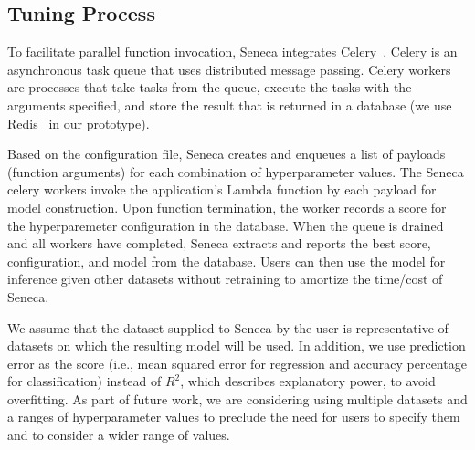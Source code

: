 \subsection{Tuning Process}

To facilitate parallel function invocation, Seneca integrates 
Celery~\cite{ref:celery}.
Celery is an asynchronous task queue 
that uses distributed message passing. Celery workers are processes 
that take tasks from the queue, execute the tasks with the arguments specified, 
and store the result that is returned 
in a database (we use Redis~\cite{ref:redis}
in our prototype). 

Based on the configuration file, Seneca creates and enqueues a list of
payloads (function arguments) for each combination of hyperparameter
values.  The Seneca celery workers invoke the application's Lambda
function by each payload for model construction. Upon function
termination, the worker records a score for the hyperparemeter
configuration in the database.  When the queue is drained and all
workers have completed, Seneca extracts and reports the best score,
configuration, and model from the database. Users can then use the
model for inference given other datasets without retraining to
amortize the time/cost of Seneca.


We assume that the dataset supplied to Seneca by the user is representative of 
datasets on which the 
resulting model will be used.  In addition, we use prediction error as the 
score (i.e., mean squared error for regression and accuracy percentage for classification) 
instead of $R^2$, which describes explanatory power, to avoid overfitting.
As part of future work, we are considering using multiple datasets and a ranges
of hyperparameter values to preclude the need for users to specify
them and to consider a wider range of values.
